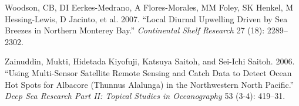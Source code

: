\documentclass[12pt,a4paper,]{article}
\begin{document}
\leavevmode\hypertarget{ref-Woodson2007}{}%
Woodson, CB, DI Eerkes-Medrano, A Flores-Morales, MM Foley, SK Henkel, M
Hessing-Lewis, D Jacinto, et al. 2007. ``Local Diurnal Upwelling Driven
by Sea Breezes in Northern Monterey Bay.'' \emph{Continental Shelf
Research} 27 (18): 2289--2302.

\leavevmode\hypertarget{ref-Zainuddin2006}{}%
Zainuddin, Mukti, Hidetada Kiyofuji, Katsuya Saitoh, and Sei-Ichi
Saitoh. 2006. ``Using Multi-Sensor Satellite Remote Sensing and Catch
Data to Detect Ocean Hot Spots for Albacore (Thunnus Alalunga) in the
Northwestern North Pacific.'' \emph{Deep Sea Research Part II: Topical
Studies in Oceanography} 53 (3-4): 419--31.
\end{document}
